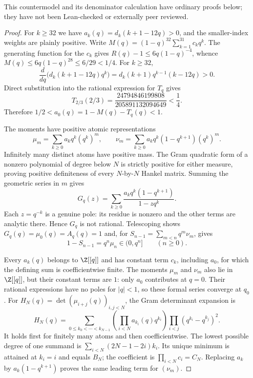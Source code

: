 This countermodel and its denominator calculation have ordinary proofs
below; they have not been Lean-checked or externally peer reviewed.

\begin{proof}
For $k\ge32$ we have $a_k(q)=d_k(k+1-12q)>0$, and the smaller-index
weights are plainly positive.  Write
$M(q)=(1-q)^{32}\sum_{k=1}^{31}c_kq^k$.
The generating function for the $c_k$ gives
$R(q)-1\le6q(1-q)^{-4}$, whence
$M(q)\le6q(1-q)^{28}\le6/29<1/4$.
For $k\ge32$,
\[
 \frac{d}{dq}\bigl(d_k(k+1-12q)q^k\bigr)
   =d_k(k+1)q^{k-1}(k-12q)>0.
\]
Direct substitution into the rational expression for $T_q$ gives
\[
 T_{2/3}(2/3)
   =\frac{24794846199808}{205891132094649}<\frac14.
\]
Therefore $1/2<a_0(q)=1-M(q)-T_q(q)<1$.

The moments have positive atomic representations
\[
 \mu_m=\sum_{k\ge0}a_kq^k(q^k)^m,\qquad
 \nu_m=\sum_{k\ge0}a_kq^k(1-q^{k+1})(q^k)^m.
\]
Infinitely many distinct atoms have positive mass.  The Gram
quadratic form of a nonzero polynomial of degree below $N$ is strictly
positive for either measure, proving positive definiteness of every
$N$-by-$N$ Hankel matrix.  Summing the geometric series in $m$ gives
\[
 G_q(z)=\sum_{k\ge0}\frac{a_kq^k(1-q^{k+1})}{1-zq^k}.
\]
Each $z=q^{-k}$ is a genuine pole: its residue is nonzero and the other
terms are analytic there.  Hence $G_q$ is not rational.  Telescoping
shows $G_q(q)=\mu_0(q)=A_q(q)=1$ and, for
$S_{n-1}=\sum_{m<n}q^m\nu_m$, gives
\[
 1-S_{n-1}=q^n\mu_n\in(0,q^n]
 \qquad(n\ge0).
\]

Every $a_k(q)$ belongs to $\Z[[q]]$ and has constant term $c_k$,
including $a_0$, for which the defining sum is coefficientwise finite.
The moments $\mu_m$ and $\nu_m$ also lie in $\Z[[q]]$, but their
constant terms are $1$: only $a_0$ contributes at $q=0$. Their
rational expressions have no poles for $|q|<1$, so these formal
series converge at $q_0$.
For $H_N(q)=\det(\mu_{i+j}(q))_{i,j<N}$, the Gram determinant expansion is
\[
 H_N(q)=\sum_{0\le k_0<\cdots<k_{N-1}}
     \left(\prod_{i<N}a_{k_i}(q)q^{k_i}\right)
     \prod_{i<j}(q^{k_i}-q^{k_j})^2.
\]
It holds first for finitely many atoms and then coefficientwise.
The lowest possible degree of one summand is
$\sum_{i<N}(2N-1-2i)k_i$.  Its unique minimum is attained at
$k_i=i$ and equals $B_N$; the coefficient is
$\prod_{i<N}c_i=C_N$.  Replacing $a_k$ by
$a_k(1-q^{k+1})$ proves the same leading term for $(\nu_m)$.


\end{proof}
